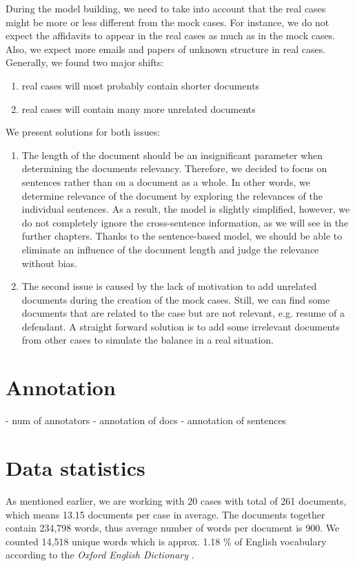 \documentclass[
  digital, %
  table,   %
  lof,     %
  lot,     %
]{fithesis3}
\begin{document}
During the model building, we need to take into account that the real cases might be more or less different from the mock cases.
For instance, we do not expect the affidavits to appear in the real cases as much as in the mock cases.
Also, we expect more emails and papers of unknown structure in real cases.
Generally, we found two major shifts: 
\begin{enumerate}
\item real cases will most probably contain shorter documents
\item real cases will contain many more unrelated documents
\end{enumerate}
We present solutions for both issues:
\begin{enumerate}
\item 
The length of the document should be an insignificant parameter when determining the documents relevancy.
Therefore, we decided to focus on sentences rather than on a document as a whole.
In other words, we determine relevance of the document by exploring the relevances of the individual sentences.
As a result, the model is slightly simplified, however, we do not completely ignore the cross-sentence information, as we will see in the further chapters.
Thanks to the sentence-based model, we should be able to eliminate an influence of the document length and judge the relevance without bias.

\item
The second issue is caused by the lack of motivation to add unrelated documents during the creation of the mock cases.
Still, we can find some documents that are related to the case but are not relevant, e.g. resume of a defendant.
A straight forward solution is to add some irrelevant documents from other cases to simulate the balance in a real situation.

\end{enumerate}

\section{Annotation}
- num of annotators
- annotation of docs
- annotation of sentences

\section{Data statistics}
As mentioned earlier, we are working with 20 cases with total of 261 documents, which means 13.15 documents per case in average.
The documents together contain 234,798 words, thus average number of words per document is 900.
We counted 14,518 unique words which is approx. 1.18 \% of English vocabulary according to the \textit{Oxford English Dictionary}  \cite{oxfordDictionaries}.
\end{document}

